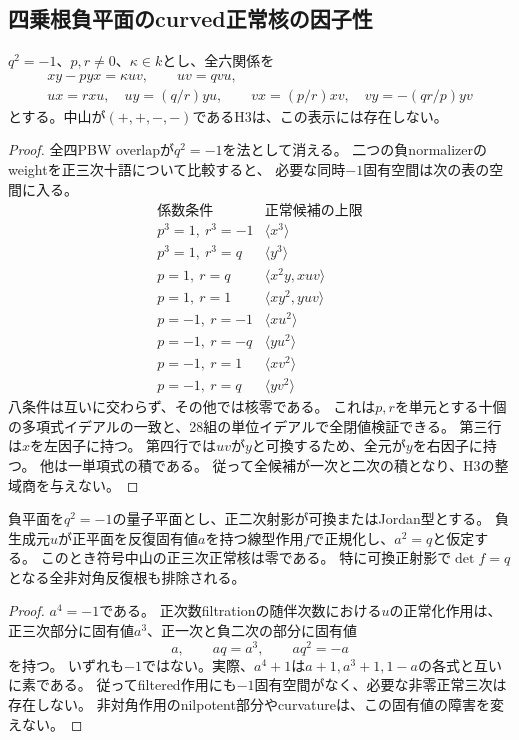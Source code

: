 \subsection{四乗根負平面のcurved正常核の因子性}
\label{subsec:h3-order2-22-curved-quarter}
\begin{proposition}\label{prop:h3-order2-22-curved-quarter-diagonal-empty}
$q^2=-1$、$p,r\ne0$、$\kappa\in k$とし、全六関係を
\begin{gather*}
 xy-pyx=\kappa uv,\qquad uv=qvu,\\
 ux=r xu,\quad uy=(q/r)yu,\qquad
 vx=(p/r)xv,\quad vy=-(qr/p)yv
\end{gather*}
とする。中山が$(+,+,-,-)$であるH3は、この表示には存在しない。
\end{proposition}
\begin{proof}
全四PBW overlapが$q^2=-1$を法として消える。
二つの負normalizerのweightを正三次十語について比較すると、
必要な同時$-1$固有空間は次の表の空間に入る。
\[
\begin{array}{c|c}
\text{係数条件}&\text{正常候補の上限}\\\hline
p^3=1,\ r^3=-1&\langle x^3\rangle\\
p^3=1,\ r^3=q&\langle y^3\rangle\\
p=1,\ r=q&\langle x^2y,xuv\rangle\\
p=1,\ r=1&\langle xy^2,yuv\rangle\\
p=-1,\ r=-1&\langle xu^2\rangle\\
p=-1,\ r=-q&\langle yu^2\rangle\\
p=-1,\ r=1&\langle xv^2\rangle\\
p=-1,\ r=q&\langle yv^2\rangle
\end{array}
\]
八条件は互いに交わらず、その他では核零である。
これは$p,r$を単元とする十個の多項式イデアルの一致と、28組の単位イデアルで全閉値検証できる。
第三行は$x$を左因子に持つ。
第四行では$uv$が$y$と可換するため、全元が$y$を右因子に持つ。
他は一単項式の積である。
従って全候補が一次と二次の積となり、H3の整域商を与えない。
\end{proof}

\begin{proposition}\label{prop:h3-order2-22-curved-quarter-repeated-empty}
負平面を$q^2=-1$の量子平面とし、正二次射影が可換またはJordan型とする。
負生成元$u$が正平面を反復固有値$a$を持つ線型作用$f$で正規化し、$a^2=q$と仮定する。
このとき符号中山の正三次正常核は零である。
特に可換正射影で$\det f=q$となる全非対角反復根も排除される。
\end{proposition}
\begin{proof}
$a^4=-1$である。
正次数filtrationの随伴次数における$u$の正常化作用は、
正三次部分に固有値$a^3$、正一次と負二次の部分に固有値
\[
 a,\qquad aq=a^3,\qquad aq^2=-a
\]
を持つ。
いずれも$-1$ではない。実際、$a^4+1$は$a+1,a^3+1,1-a$の各式と互いに素である。
従ってfiltered作用にも$-1$固有空間がなく、必要な非零正常三次は存在しない。
非対角作用のnilpotent部分やcurvatureは、この固有値の障害を変えない。
\end{proof}

